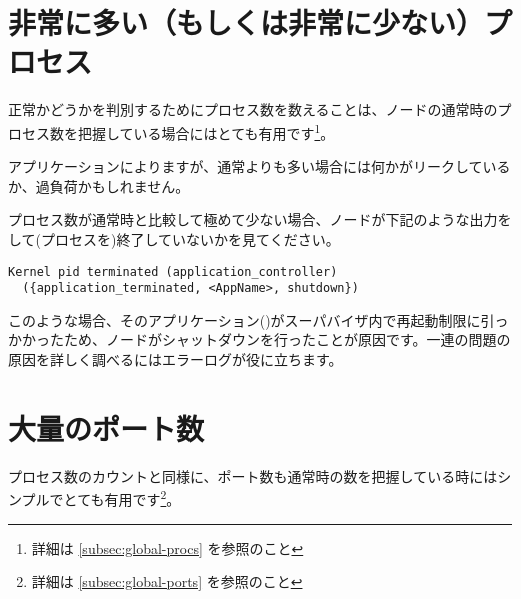 \section{非常に多い（もしくは非常に少ない）プロセス}

正常かどうかを判別するためにプロセス数を数えることは、ノードの通常時のプロセス数を把握している場合にはとても有用です\footnote{詳細は \ref{subsec:global-procs} を参照のこと}。

アプリケーションによりますが、通常よりも多い場合には何かがリークしているか、過負荷かもしれません。

プロセス数が通常時と比較して極めて少ない場合、ノードが下記のような出力をして(プロセスを)終了していないかを見てください。

\begin{Verbatim}
Kernel pid terminated (application_controller)
  ({application_terminated, <AppName>, shutdown})
\end{Verbatim}

このような場合、そのアプリケーション()がスーパバイザ内で再起動制限に引っかかったため、ノードがシャットダウンを行ったことが原因です。一連の問題の原因を詳しく調べるにはエラーログが役に立ちます。


\section{大量のポート数}

プロセス数のカウントと同様に、ポート数も通常時の数を把握している時にはシンプルでとても有用です\footnote{詳細は \ref{subsec:global-ports}  を参照のこと}。

